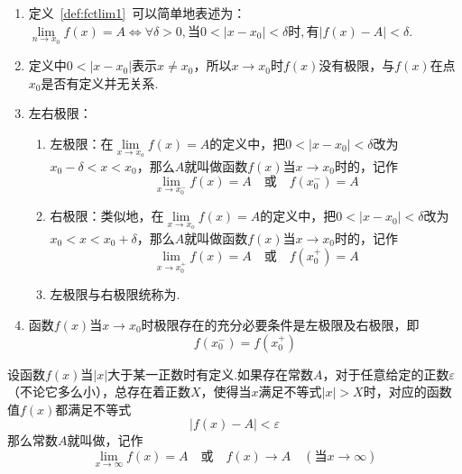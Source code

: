 \begin{note}
	\begin{enumerate}
		\item 定义\ \ref{def:fctlim1}\ 可以简单地表述为：
		\( \lim\limits_{n \to x_{0}}f(x) = A \Leftrightarrow \forall \delta > 0,\text{当}0<|x - x_{0}|<\delta \text{时},\text{有}|f(x) - A| < \delta \).
		\item 定义中\( 0 < |x - x_{0}| \)表示\( x \neq x_{0} \)，所以\( x \to x_{0} \)时\( f(x) \)没有极限，与\( f(x) \)在点\( x_{0} \)是否有定义并无关系.
		\item 左右极限：
		\begin{enumerate}
			\item 左极限：在\( \lim\limits_{x \to x_{o}}f(x) = A \)的定义中，把\( 0 < |x - x_{0}| < \delta \)改为\( x_{0} - \delta < x < x_{0} \)，那么\( A \)就叫做函数\( f(x) \)当\( x \to x_{0} \)时的，记作
			\[ \lim_{x \to x_{0}^{-}}f(x) = A \quad \text{或} \quad f(x_{0}^{-}) = A \]
			\item 右极限：类似地，在\( \lim\limits_{x \to x_{o}}f(x) = A \)的定义中，把\( 0 < |x - x_{0}| < \delta \)改为\( x_{0} < x < x_{0} + \delta \)，那么\( A \)就叫做函数\( f(x) \)当\( x \to x_{0} \)时的，记作
			\[ \lim_{x \to x_{0}^{+}}f(x) = A \quad \text{或} \quad f(x_{0}^{+}) = A \]
			\item 左极限与右极限统称为.
		\end{enumerate}
		\item 函数\( f(x) \)当\( x \to x_{0} \)时极限存在的{\heiti 充分必要条件}是左极限及右极限，即
		\[ f(x_{0}^{-}) = f(x_{0}^{+}) \]
	\end{enumerate}
\end{note}

\begin{definition}[函数极限]
	\label{def:fctlim2}
	设函数\( f(x) \)当\( |x| \)大于某一正数时有定义.如果存在常数\( A \)，对于任意给定的正数\( \varepsilon \)（不论它多么小），总存在着正数\( X \)，使得当\( x \)满足不等式\( |x| > X \)时，对应的函数值\( f(x) \)都满足不等式
	\[ |f(x) - A| < \varepsilon \]
	那么常数\( A \)就叫做，记作
	\[ \lim\limits_{x \to \infty}f(x) = A \quad \text{或} \quad f(x) \to A\quad(\text{当}x \to \infty) \]
\end{definition}

